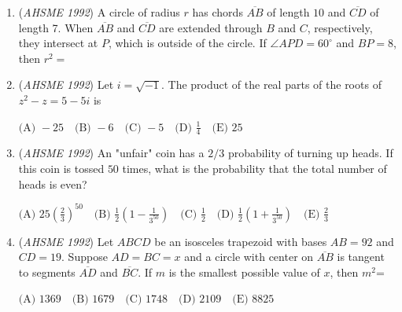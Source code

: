 \begin{enumerate}
 Semicircle $\widehat{AB}$ has center $C$ and radius $1$. Point $D$ is on $\widehat{AB}$ and $\overline{CD}\perp\overline{AB}$. Extend $\overline{BD}$ and $\overline{AD}$ to $E$ and $F$, respectively, so that circular arcs $\widehat{AE}$ and $\widehat{BF}$ have $B$ and $A$ as their respective centers. Circular arc $\widehat{EF}$ has center $D$. The area of the shaded "smile" $AEFBDA$, is


 $\text{(A) } \left(2-\sqrt{2}\right)\pi\quad \text{(B) } 2\pi-\pi \sqrt{2}-1\quad \text{(C) } \left(1-\frac{\sqrt{2}}{2}\right)\pi\quad\\ \text{(D) } \frac{5\pi}{2}-\pi\sqrt{2}-1\quad \text{(E) } \left(3-2\sqrt{2}\right)\pi$


	\item (\textit{AHSME 1992}) A circle of radius $r$ has chords $\overline{AB}$ of length $10$ and $\overline{CD}$ of length 7. When $\overline{AB}$ and $\overline{CD}$ are extended through $B$ and $C$, respectively, they intersect at $P$, which is outside of the circle. If $\angle{APD}=60^\circ$ and $BP=8$, then $r^2=$


	\item (\textit{AHSME 1992}) Let $i=\sqrt{-1}$. The product of the real parts of the roots of $z^2-z=5-5i$ is


 $\text{(A) } -25\quad \text{(B) } -6\quad \text{(C) } -5\quad \text{(D) } \frac{1}{4}\quad \text{(E) } 25$


	\item (\textit{AHSME 1992}) An "unfair" coin has a $2/3$ probability of turning up heads. If this coin is tossed $50$ times, what is the probability that the total number of heads is even?


 $\text{(A) } 25\left(\frac{2}{3}\right)^{50}\quad \text{(B) } \frac{1}{2}\left(1-\frac{1}{3^{50}}\right)\quad \text{(C) } \frac{1}{2}\quad \text{(D) } \frac{1}{2}\left(1+\frac{1}{3^{50}}\right)\quad \text{(E) } \frac{2}{3}$


	\item (\textit{AHSME 1992}) Let $ABCD$ be an isosceles trapezoid with bases $AB=92$ and $CD=19$. Suppose $AD=BC=x$ and a circle with center on $\overline{AB}$ is tangent to segments $\overline{AD}$ and $\overline{BC}$. If $m$ is the smallest possible value of $x$, then $m^2$=


 $\text{(A) } 1369\quad \text{(B) } 1679\quad \text{(C) } 1748\quad \text{(D) } 2109\quad \text{(E) } 8825$


\end{enumerate}